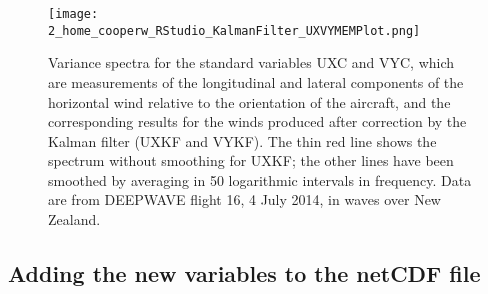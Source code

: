 \documentclass[12pt,twoside,english,12pt,twoside,english]{article}\usepackage[]{graphicx}\usepackage[]{color}
\let\OrgIndex\index
\renewcommand*{\index}[1]{\OrgIndex{#1}}
\begin{document}
\begin{figure}
\begin{centering}
\texttt{[image: 2\_home\_cooperw\_RStudio\_KalmanFilter\_UXVYMEMPlot.png]}
\par\end{centering}
\caption[Variance spectra for the standard measurements of the longitudinal and lateral components of the horizontal wind and for the corresponding results after correction by the Kalman filter.]{Variance spectra for the standard variables UXC and VYC, which are measurements of the longitudinal and lateral components of the horizontal wind relative to the orientation of the aircraft, and the corresponding results for the winds produced after correction by the Kalman filter (UXKF and VYKF). The thin red line shows the spectrum without smoothing for UXKF; the other lines have been smoothed by averaging in 50 logarithmic intervals in frequency. Data are from DEEPWAVE flight 16, 4 July 2014, in waves over New Zealand.\label{fig:Variance-spectra-UXVY}} 

\end{figure}



\subsection{Adding the new variables to the netCDF file}
\end{document}
